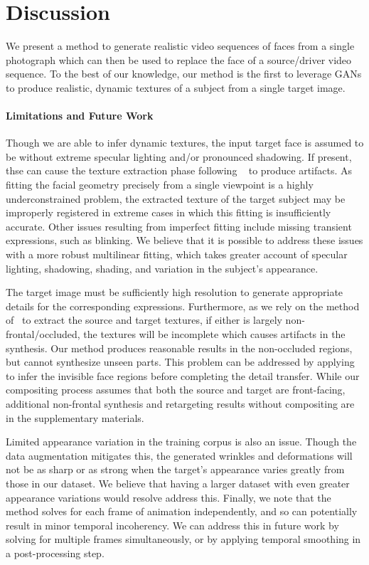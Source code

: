 
\section{Discussion}

We present a method to generate realistic video sequences of faces from a single photograph 
which can then be used to replace the face of a source/driver video sequence. To the best of our knowledge, our method is the first to leverage GANs to produce realistic, dynamic textures of a subject from a single target image.

\paragraph{Limitations and Future Work}
Though we are able to infer dynamic textures, the input target face is assumed to be without extreme specular lighting and/or pronounced shadowing. If present, thse can cause the texture extraction phase following ~\cite{f2f} to produce artifacts. As fitting the facial geometry precisely from a single viewpoint is a highly underconstrained problem, the extracted texture of the target subject may be improperly registered in extreme cases in which this fitting is insufficiently accurate. Other issues resulting from imperfect fitting include missing transient expressions, such as blinking. We believe that it is possible to address these issues with a more robust multilinear fitting, which takes greater account of specular lighting, shadowing, shading, and variation in the subject's appearance.   

The target image must be sufficiently high resolution to generate appropriate details for the corresponding expressions. Furthermore, as we rely on the method of~\cite{f2f} to extract the source and target textures, if either is largely non-frontal/occluded, the textures will be incomplete which causes artifacts in the synthesis.  Our method produces reasonable results in the non-occluded regions, but cannot synthesize unseen parts. This problem can be addressed by applying~\cite{saito2016} to infer the invisible face regions before completing the detail transfer. While our compositing process assumes that both the source and target are front-facing, additional non-frontal synthesis and retargeting results without compositing are in the supplementary materials.  


Limited appearance variation in the training corpus is also an issue.  Though the data augmentation mitigates this, the generated wrinkles and deformations will not be as sharp or as strong when the target's appearance varies greatly from those in our dataset. We believe that having a larger dataset with even greater appearance variations would resolve address this. Finally, we note that the method solves for each frame of animation independently, and so can potentially result in minor temporal incoherency.  We can address this in future work by solving for multiple frames simultaneously, or by applying temporal smoothing in a post-processing step.  


